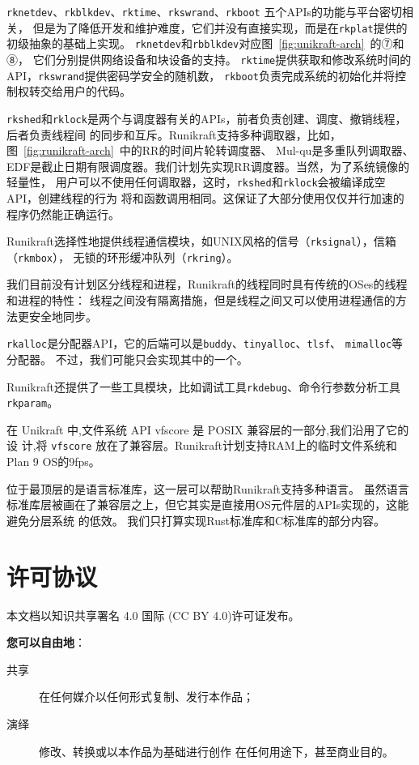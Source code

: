 \documentclass[UTF8,fontset=none,linespread=1.15]{ctexart}
\begin{document}
\texttt{rknetdev}、\texttt{rkblkdev}、\texttt{rktime}、\texttt{rkswrand}、\texttt{rkboot}
五个APIs的功能与平台密切相关，
但是为了降低开发和维护难度，它们并没有直接实现，而是在\texttt{rkplat}提供的初级抽象的基础上实现。
\texttt{rknetdev}和\texttt{rbblkdev}对应图\ \ref{fig:unikraft-arch}\ 的⑦和⑧，
它们分别提供网络设备和块设备的支持。
\texttt{rktime}提供获取和修改系统时间的API，\texttt{rkswrand}提供密码学安全的随机数，
\texttt{rkboot}负责完成系统的初始化并将控制权转交给用户的代码。

\texttt{rkshed}和\texttt{rklock}是两个与调度器有关的APIs，前者负责创建、调度、撤销线程，后者负责线程间
的同步和互斥。Runikraft支持多种调取器，比如，图\ \ref{fig:runikraft-arch}\ 中的RR的时间片轮转调度器、
Mul-qu是多重队列调取器、EDF是截止日期有限调度器。我们计划先实现RR调度器。当然，为了系统镜像的轻量性，
用户可以不使用任何调取器，这时，\texttt{rkshed}和\texttt{rklock}会被编译成空API，创建线程的行为
将和函数调用相同。这保证了大部分使用仅仅并行加速的程序仍然能正确运行。

Runikraft选择性地提供线程通信模块，如UNIX风格的信号（\texttt{rksignal}），信箱（\texttt{rkmbox}），
无锁的环形缓冲队列（\texttt{rkring}）。

我们目前没有计划区分线程和进程，Runikraft的线程同时具有传统的OSes的线程和进程的特性：
线程之间没有隔离措施，但是线程之间又可以使用进程通信的方法更安全地同步。

\texttt{rkalloc}是分配器API，它的后端可以是\texttt{buddy}、\texttt{tinyalloc}、\texttt{tlsf}、
\texttt{mimalloc}等分配器。
不过，我们可能只会实现其中的一个。

Runikraft还提供了一些工具模块，比如调试工具\texttt{rkdebug}、命令行参数分析工具\texttt{rkparam}。

在 Unikraft 中,文件系统 API vfscore 是 POSIX 兼容层的一部分,我们沿用了它的设
计,将 \texttt{vfscore} 放在了兼容层。Runikraft计划支持RAM上的临时文件系统和Plan 9 OS的9fps。

位于最顶层的是语言标准库，这一层可以帮助Runikraft支持多种语言。
虽然语言标准库层被画在了兼容层之上，但它其实是直接用OS元件层的APIs实现的，这能避免分层系统
的低效。
我们只打算实现Rust标准库和C标准库的部分内容。


\section*{许可协议}
本文档以知识共享署名 4.0 国际 (CC BY 4.0)许可证发布。

\vspace{2ex}
\noindent\textbf{\large 您可以自由地}：
\begin{description}
\item[共享] 在任何媒介以任何形式复制、发行本作品；
\item[演绎] 修改、转换或以本作品为基础进行创作
在任何用途下，甚至商业目的。
\end{description}
\end{document}
